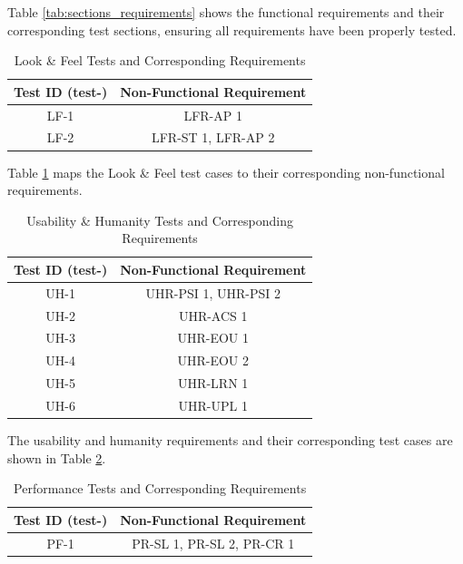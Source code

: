 \documentclass[12pt, titlepage]{article}
\begin{document}
Table \ref{tab:sections_requirements} shows the functional requirements and their corresponding test sections, ensuring all requirements have been properly tested.

  \begin{table}[H]
  \centering
  \caption{Look \& Feel Tests and Corresponding Requirements}
  \label{tab:nfr-trace-lf}
  \begin{tabular}{cc}
    \toprule \textbf{Test ID (test-)} & \textbf{Non-Functional Requirement} \\
    \midrule
    LF-1 & LFR-AP 1 \\
    LF-2 & LFR-ST 1, LFR-AP 2 \\
    \bottomrule
  \end{tabular}
\end{table}

Table \ref{tab:nfr-trace-lf} maps the Look \& Feel test cases to their corresponding non-functional requirements.

  \begin{table}[H]
  \centering
  \caption{Usability \& Humanity Tests and Corresponding Requirements}
  \label{tab:nfr-trace-uh}
  \begin{tabular}{cc}
    \toprule \textbf{Test ID (test-)} & \textbf{Non-Functional Requirement} \\
    \midrule
    UH-1 & UHR-PSI 1, UHR-PSI 2 \\
    UH-2 & UHR-ACS 1 \\
    UH-3 & UHR-EOU 1 \\
    UH-4 & UHR-EOU 2 \\
    UH-5 & UHR-LRN 1 \\
    UH-6 & UHR-UPL 1 \\
    \bottomrule
  \end{tabular}
\end{table}

The usability and humanity requirements and their corresponding test cases are shown in Table \ref{tab:nfr-trace-uh}.

\begin{table}[H]
  \centering
  \caption{Performance Tests and Corresponding Requirements}
  \begin{tabular}{cc}
    \toprule \textbf{Test ID (test-)} & \textbf{Non-Functional Requirement} \\
    \midrule
    PF-1 & PR-SL 1, PR-SL 2, PR-CR 1 \\
    \bottomrule
  \end{tabular}
  \label{tab:nfr-trace-perf}
\end{table}
\end{document}
